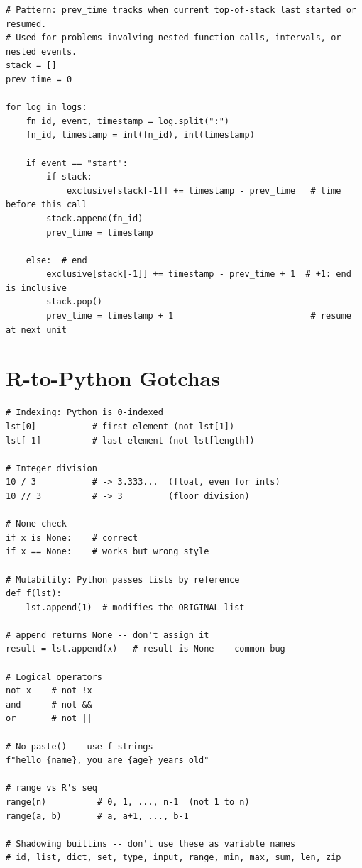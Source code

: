 \documentclass[10pt,letterpaper]{article}
\begin{document}
\begin{lstlisting}
# Pattern: prev_time tracks when current top-of-stack last started or resumed.
# Used for problems involving nested function calls, intervals, or nested events.
stack = []
prev_time = 0

for log in logs:
    fn_id, event, timestamp = log.split(":")
    fn_id, timestamp = int(fn_id), int(timestamp)

    if event == "start":
        if stack:
            exclusive[stack[-1]] += timestamp - prev_time   # time before this call
        stack.append(fn_id)
        prev_time = timestamp

    else:  # end
        exclusive[stack[-1]] += timestamp - prev_time + 1  # +1: end is inclusive
        stack.pop()
        prev_time = timestamp + 1                           # resume at next unit
\end{lstlisting}

\section{R-to-Python Gotchas}

\begin{lstlisting}
# Indexing: Python is 0-indexed
lst[0]           # first element (not lst[1])
lst[-1]          # last element (not lst[length])

# Integer division
10 / 3           # -> 3.333...  (float, even for ints)
10 // 3          # -> 3         (floor division)

# None check
if x is None:    # correct
if x == None:    # works but wrong style

# Mutability: Python passes lists by reference
def f(lst):
    lst.append(1)  # modifies the ORIGINAL list

# append returns None -- don't assign it
result = lst.append(x)   # result is None -- common bug

# Logical operators
not x    # not !x
and      # not &&
or       # not ||

# No paste() -- use f-strings
f"hello {name}, you are {age} years old"

# range vs R's seq
range(n)          # 0, 1, ..., n-1  (not 1 to n)
range(a, b)       # a, a+1, ..., b-1

# Shadowing builtins -- don't use these as variable names
# id, list, dict, set, type, input, range, min, max, sum, len, zip
\end{lstlisting}
\end{document}
